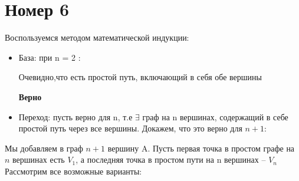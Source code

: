 \documentclass[a4paper,12pt]{article}
\begin{document}
\section*{Номер 6}
Воспользуемся методом математической индукции:
\begin{itemize}
\item База: при n = 2 :

Очевидно,что есть простой путь, включающий в себя обе вершины
\begin{center}
\textbf{Верно}
\end{center}
\item Переход: пусть верно для n, т.е $\exists$ граф на n вершинах, содержащий в себе простой путь через все вершины. Докажем, что это верно для $n+1$:
\end{itemize}
Мы добавляем в граф $n+1$ вершину A. Пусть первая точка в простом графе на $n$ вершинах есть $V_1$, а последняя точка в простом пути на n вершинах -- $V_n$ Рассмотрим все возможные варианты:
\end{document}
